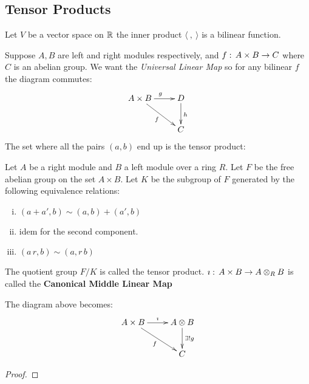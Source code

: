 \subsection{Tensor Products}
\begin{examples}
Let $V$ be a vector space on $\mathbb{R}$ the inner product $\langle\ ,\ \rangle$ is a bilinear function.
\end{examples}

Suppose $A,B$ are left and right modules respectively, and $f:\, A\times B \to C$ where $C$ is an abelian group. We want the \emph{Universal Linear Map} so for any bilinear $f$ the diagram commutes:
\[\xymatrix{
A\times B\ar[r]^g\ar[dr]_f     &      D\ar[d]^h    \\
  & C     } \]
The set where all the pairs $(a,b)$ end up is the tensor product:
\begin{ddef}
Let $A$ be a right module and $B$ a left module over a ring $R$. Let $F$ be the free abelian group on the set $A\times B$. Let $K$ be the subgroup of $F$ generated by the following equivalence relations:
\begin{enumerate}[(i)]
\item $(a+a',b)\sim (a,b) + (a',b) $
\item idem for the second component.
\item $(a\,r,b) \sim (a,r\,b)$
\end{enumerate}
The quotient group $F/K$ is called the tensor product. $\imath:\, A\times B \to A\otimes_R B $ is called the \textbf{Canonical  Middle Linear Map}
\end{ddef}
\begin{teorema}
The diagram above becomes:
\[\xymatrix{
A\times B\ar[r]^\imath\ar[dr]_{f}     &      A\otimes B\ar[d]^{\exists ! g}    \\
  & C     } \]
\begin{proof}

\end{proof}
\end{teorema}


